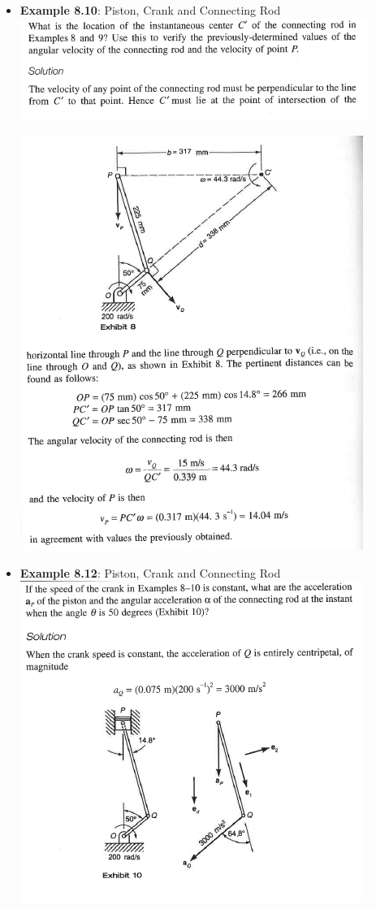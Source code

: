\documentclass[11pt]{article}
\begin{document}
\begin{itemize}
	
\newpage
	\item  \textbf{\Large Example 8.10}: Piston, Crank and Connecting Rod\\

\includegraphics[scale=1.2]{example_8_10.png}

\includegraphics[scale=1.2]{example_8_10b.png}


\newpage
	\item  \textbf{\Large Example 8.12}: Piston, Crank and Connecting Rod\\

\includegraphics[scale=1.1]{example_8_12.png}


\end{itemize}
\end{document}
